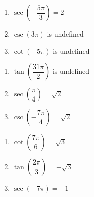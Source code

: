 \documentclass{ximera}
\begin{document}
\begin{multicols}{3}

\begin{enumerate}

\setcounter{enumi}{\value{HW}}

\item $\sec \left( -\dfrac{5\pi}{3} \right) = 2$
\item $\csc \left( 3\pi \right)$ is undefined 
\item $\cot \left( -5\pi \right)$ is undefined 

\setcounter{HW}{\value{enumi}}

\end{enumerate}

\end{multicols}

\begin{multicols}{3}

\begin{enumerate}

\setcounter{enumi}{\value{HW}}

\item $\tan \left( \dfrac{31\pi}{2} \right)$ is undefined
\item $\sec \left( \dfrac{\pi}{4} \right) = \sqrt{2}$ 
\item $\csc \left( -\dfrac{7\pi}{4} \right) = \sqrt{2}$

\setcounter{HW}{\value{enumi}}

\end{enumerate}

\end{multicols}

\begin{multicols}{3}

\begin{enumerate}

\setcounter{enumi}{\value{HW}}

\item $\cot \left( \dfrac{7\pi}{6} \right) = \sqrt{3}$
\item $\tan \left( \dfrac{2\pi}{3} \right) = -\sqrt{3}$
\item $\sec \left( -7\pi \right) = -1$ 

\setcounter{HW}{\value{enumi}}

\end{enumerate}

\end{multicols}
\end{document}

